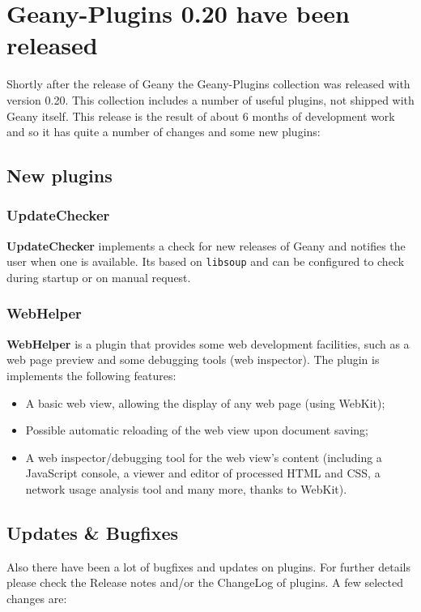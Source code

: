 \documentclass[%
paper=a4,%
fontsize=11pt,%
twoside=false,%
DIV18,
headsepline,
plainheadsepline,
footsepline,
plainfootsepline,
parskip=half,%
openany,%
]{scrartcl}
\begin{document}
\section{Geany-Plugins 0.20 have been released}

Shortly after the release of Geany the Geany-Plugins collection
was released with version 0.20. This collection
includes a number of useful plugins, not shipped with Geany itself.
This release is the result of about 6 months of development work
and so it has quite a number of changes and some new plugins:

\subsection{New plugins}
\subsubsection{UpdateChecker}

\textbf{UpdateChecker} implements a check for new
releases of Geany and notifies the user when one is
available. Its based on \texttt{libsoup} and can be configured to check
during startup or on manual request.

\subsubsection{WebHelper}

\textbf{WebHelper} is a plugin that provides some web
development facilities, such as a web page preview and some
debugging tools (web inspector). The plugin is implements
the following features:

\begin{itemize}
	\item A basic web view, allowing the display of any web page (using WebKit);
	\item Possible automatic reloading of the web view upon document saving;
	\item A web inspector/debugging tool for the web view's content (including a
		JavaScript console, a viewer and editor of processed HTML and CSS, a network
		usage analysis tool and many more, thanks to WebKit).
\end{itemize}

\subsection{Updates \& Bugfixes}

Also there have been a lot of bugfixes and updates on plugins. For
further details please check the Release notes and/or the ChangeLog
of plugins. A few selected changes are:
\end{document}
